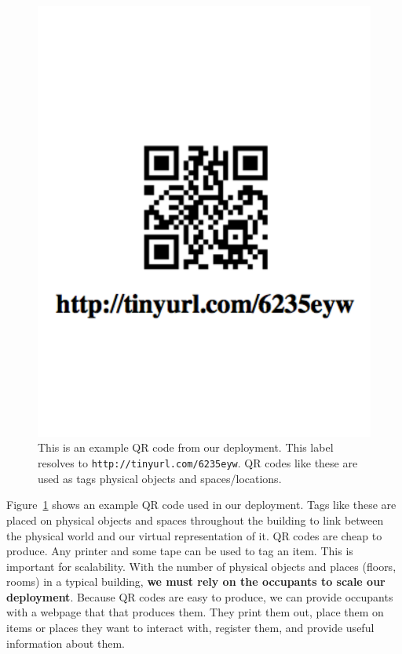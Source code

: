 \begin{figure}[htb!]
\begin{center}
\includegraphics[scale=0.3]{figs/qrcex}
\caption{This is an example QR code from our deployment. This label resolves to {\tt http://tinyurl.com/6235eyw}.
QR codes like these are used as tags physical objects and spaces/locations.}
\label{fig:qrcex}
\end{center}
\end{figure}

Figure~\ref{fig:qrcex} shows an example QR code used in our deployment.  Tags like these are placed on physical
objects and spaces throughout the building to link between the physical world and our virtual representation of it.
QR codes are cheap to produce.  Any printer and some tape can be used to tag an item.  This is important for scalability.
With the number of physical objects and places (floors, rooms) in a typical building, {\bf we must rely on the occupants
to scale our deployment}. Because QR codes are easy to produce, we can provide occupants with a webpage that
that produces them.  They print them out, place them on items or
places they want to interact with, register them, and provide useful
information about them.

